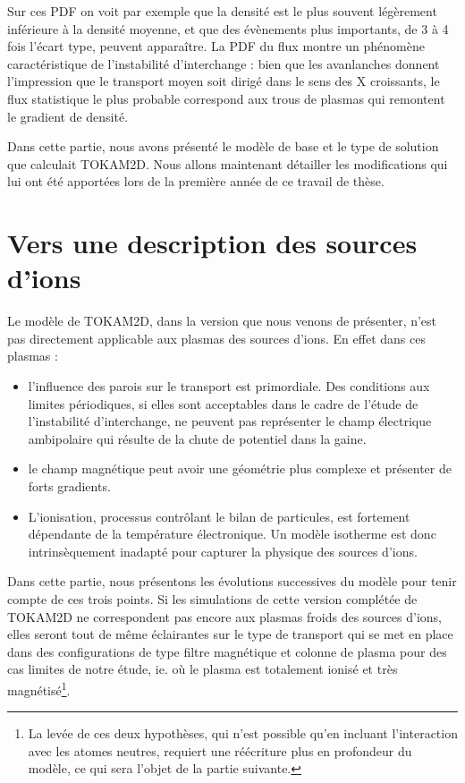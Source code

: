 \begin{refsection}
Sur ces PDF on voit par exemple que la densité est le plus souvent
légèrement inférieure à la densité moyenne, et que des évènements plus
importants, de 3 à 4 fois l'écart type, peuvent apparaître. La PDF du flux
montre un phénomène caractéristique de l'instabilité d'interchange : bien que
les avanlanches donnent l'impression que le transport moyen soit dirigé dans
le sens des X croissants, le flux statistique le plus probable correspond aux
trous de plasmas qui remontent le gradient de densité.

Dans cette partie, nous avons présenté le modèle de base et le type
de solution que calculait TOKAM2D. Nous allons maintenant détailler les
modifications qui lui ont été apportées lors de la première année de ce travail
de thèse.

\section{Vers une description des sources d'ions}

Le modèle de TOKAM2D, dans la version que nous venons de présenter, n'est pas
directement applicable aux plasmas des sources d'ions. En effet dans
ces plasmas :

\begin{itemize}
	\item l'influence des parois sur le transport est primordiale. Des conditions
	aux limites périodiques, si elles sont acceptables dans le cadre de l'étude de
	l'instabilité d'interchange, ne peuvent pas représenter le champ électrique
	ambipolaire qui résulte de la chute de potentiel dans la gaine.
	\item le champ magnétique peut avoir une géométrie plus complexe et présenter
	de forts gradients.
	\item L'ionisation, processus contrôlant le bilan de particules, est fortement
	dépendante de la température électronique. Un modèle isotherme est donc
	intrinsèquement inadapté pour capturer la physique des sources d'ions.
\end{itemize}

Dans cette partie, nous présentons les évolutions successives du modèle pour
tenir compte de ces trois points.
Si les simulations de cette version complétée de TOKAM2D ne correspondent pas
encore aux plasmas froids des sources d'ions, elles seront tout de même
éclairantes sur le type de
transport qui se met en place dans des configurations de type filtre magnétique
et colonne de plasma pour des cas limites de notre étude, ie. où le plasma
est totalement ionisé et très magnétisé\footnote{La levée de ces deux hypothèses, qui n'est possible qu'en incluant l'interaction avec les atomes neutres, requiert une réécriture
plus en profondeur du modèle, ce qui sera l'objet de la partie suivante.}.


\end{refsection}
